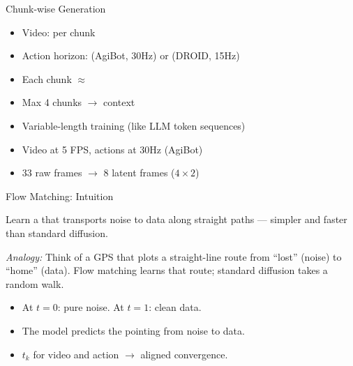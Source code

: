 \begin{frame}{Chunk-wise Generation}
\begin{methodbox}
\begin{itemize}
    \item Video:  per chunk
    \item Action horizon:  (AgiBot, 30Hz)
          or  (DROID, 15Hz)
    \item Each chunk $\approx$ 
    \item Max 4 chunks $\rightarrow$  context
\end{itemize}
\end{methodbox}

\vspace{0.5em}
\begin{itemize}
    \item Variable-length training (like LLM token sequences)
    \item Video at 5 FPS, actions at 30Hz (AgiBot)
    \item 33 raw frames $\rightarrow$ 8 latent frames ($4\times2$)
\end{itemize}
\end{frame}

\begin{frame}{Flow Matching: Intuition}
\begin{keybox}
Learn a  that transports noise to data
along straight paths --- simpler and faster than
standard diffusion.
\end{keybox}

\vspace{0.3em}
{\small\emph{Analogy:} Think of a GPS that plots a
straight-line route from ``lost'' (noise) to ``home'' (data).
Flow matching learns that route; standard diffusion
takes a random walk.}

\vspace{0.5em}
\begin{itemize}
    \item At $t=0$: pure noise. At $t=1$: clean data.
    \item The model predicts the 
          pointing from noise to data.
    \item {} $t_k$ for video and action
          $\rightarrow$ aligned convergence.
\end{itemize}
\end{frame}

